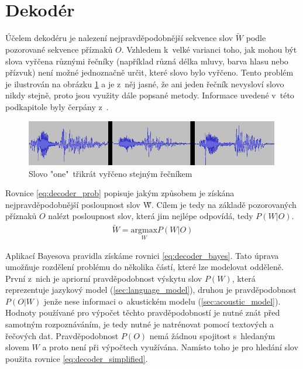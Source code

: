 \newpage
\section{Dekodér}\label{sec:decoder}
Účelem dekodéru je nalezení nejpravděpodobnější sekvence slov $\tilde{W}$ podle pozorované sekvence příznaků $O$. Vzhledem k~velké varianci toho, jak mohou být slova vyřčena různými řečníky (například různá délka mluvy, barva hlasu nebo přízvuk) není možné jednoznačně určit, které slovo bylo vyřčeno. Tento problém je ilustrován na obrázku \ref{fig:one_analog} a je z~něj jasné, že ani jeden řečník nevysloví slovo nikdy stejně, proto jsou využity dále popsané metody. Informace uvedené v~této podkapitole byly čerpány z~\cite{psutka}.
\begin{figure}[H]
	\centering
		\includegraphics[height=2cm]{obrazky-figures/one_analog.png}
        \caption{Slovo "one"~třikrát vyřčeno stejným řečníkem}
        \label{fig:one_analog}
\end{figure}

Rovnice \ref{eq:decoder_prob} popisuje jakým způsobem je získána nejpravděpodobnější posloupnost slov \~{W}. Cílem je tedy na základě pozorovaných příznaků $O$ nalézt posloupnost slov, která jim nejlépe odpovídá, tedy $P(W|O)$.
\begin{equation} \label{eq:decoder_prob}
\begin{gathered}
\tilde{W} = \underset{W}{\mathrm{arg max}} P(W|O) 
\end{gathered}
\end{equation}

Aplikací Bayesova pravidla získáme rovnici \ref{eq:decoder_bayes}. Tato úprava umožňuje rozdělení problému do několika částí, které lze modelovat odděleně. První z~nich je apriorní pravděpodobnost výskytu slov $P(W)$, která reprezentuje jazykový model (\ref{sec:language_model}), druhou je pravděpodobnost $P(O|W)$ jenže nese informaci o~akustickém modelu (\ref{sec:acoustic_model}). Hodnoty používané pro výpočet těchto pravděpodobností je nutné znát před samotným rozpoznáváním, je tedy nutné je natrénovat pomocí textových a řečových dat. Pravděpodobnost $P(O)$ nemá žádnou spojitost s~hledaným slovem $W$ a proto není při výpočtech využívána. Namísto toho je pro hledání slov použita rovnice \ref{eq:decoder_simplified}.

